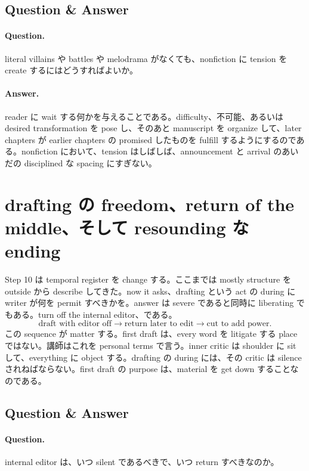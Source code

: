 \subsection{Question \& Answer}

\paragraph{Question.} literal villains や battles や melodrama がなくても、nonfiction に tension を create するにはどうすればよいか。

\paragraph{Answer.} reader に wait する何かを与えることである。difficulty、不可能、あるいは desired transformation を pose し、そのあと manuscript を organize して、later chapters が earlier chapters の promised したものを fulfill するようにするのである。nonfiction において、tension はしばしば、announcement と arrival のあいだの disciplined な spacing にすぎない。

\section{drafting の freedom、return of the middle、そして resounding な ending}

Step 10 は temporal register を change する。ここまでは mostly structure を outside から describe してきた。now it asks、drafting という act の during に writer が何を permit すべきかを。answer は severe であると同時に liberating でもある。turn off the internal editor、である。
\begin{equation}
\text{draft with editor off} \to \text{return later to edit} \to \text{cut to add power}.
\end{equation}
この sequence が matter する。first draft は、every word を litigate する place ではない。講師はこれを personal terms で言う。inner critic は shoulder に sit して、everything に object する。drafting の during には、その critic は silence されねばならない。first draft の purpose は、material を get down することなのである。

\subsection{Question \& Answer}

\paragraph{Question.} internal editor は、いつ silent であるべきで、いつ return すべきなのか。

